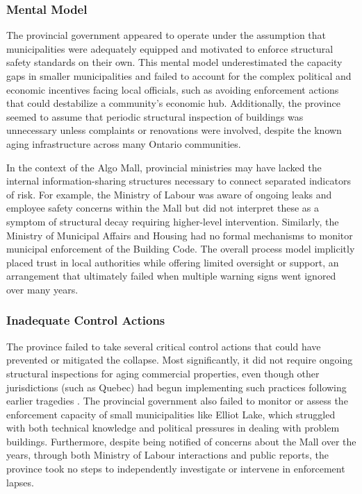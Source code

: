 \documentclass[12pt]{article}
\begin{document}
\subsubsection*{Mental Model}
The provincial government appeared to operate under the assumption that municipalities were adequately equipped and motivated to enforce structural safety standards on their own. This mental model underestimated the capacity gaps in smaller municipalities and failed to account for the complex political and economic incentives facing local officials, such as avoiding enforcement actions that could destabilize a community's economic hub. Additionally, the province seemed to assume that periodic structural inspection of buildings was unnecessary unless complaints or renovations were involved, despite the known aging infrastructure across many Ontario communities.

In the context of the Algo Mall, provincial ministries may have lacked the internal information-sharing structures necessary to connect separated indicators of risk. For example, the Ministry of Labour was aware of ongoing leaks and employee safety concerns within the Mall but did not interpret these as a symptom of structural decay requiring higher-level intervention. Similarly, the Ministry of Municipal Affairs and Housing had no formal mechanisms to monitor municipal enforcement of the Building Code. The overall process model implicitly placed trust in local authorities while offering limited oversight or support, an arrangement that ultimately failed when multiple warning signs went ignored over many years.

\subsubsection*{Inadequate Control Actions}
The province failed to take several critical control actions that could have prevented or mitigated the collapse. Most significantly, it did not require ongoing structural inspections for aging commercial properties, even though other jurisdictions (such as Quebec) had begun implementing such practices following earlier tragedies \cite[p.585-586]{AlgoLakeReport1}. The provincial government also failed to monitor or assess the enforcement capacity of small municipalities like Elliot Lake, which struggled with both technical knowledge and political pressures in dealing with problem buildings. Furthermore, despite being notified of concerns about the Mall over the years, through both Ministry of Labour interactions and public reports, the province took no steps to independently investigate or intervene in enforcement lapses.
\end{document}
